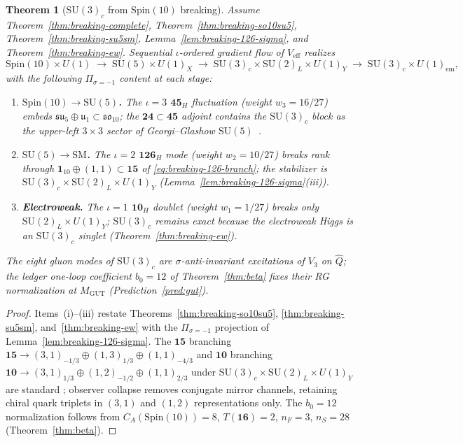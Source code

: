 \documentclass[11pt]{article}
\theoremstyle{plain}
\newtheorem{theorem}{Theorem}[section]
\theoremstyle{definition}
\theoremstyle{remark}
\numberwithin{equation}{section}
\newcommand{\Spin}{\mathrm{Spin}}
\begin{document}
\begin{theorem}[$\mathrm{SU}(3)_c$ from $\Spin(10)$ breaking]
\label{thm:qcd-derived}
Assume Theorem~\ref{thm:breaking-complete},
Theorem~\ref{thm:breaking-so10su5}, Theorem~\ref{thm:breaking-su5sm},
Lemma~\ref{lem:breaking-126-sigma}, and Theorem~\ref{thm:breaking-ew}.
Sequential $\iota$-ordered gradient flow of $V_{\mathrm{eff}}$ realizes
\begin{equation}\label{eq:qcd-breaking-chain}
  \Spin(10)\times U(1)
  \;\longrightarrow\;
  \mathrm{SU}(5)\times U(1)_X
  \;\longrightarrow\;
  \mathrm{SU}(3)_c\times\mathrm{SU}(2)_L\times U(1)_Y
  \;\longrightarrow\;
  \mathrm{SU}(3)_c\times U(1)_{\mathrm{em}},
\end{equation}
with the following $\Pi_{\sigma=-1}$ content at each stage:
\begin{enumerate}[label=(\roman*),leftmargin=*]
  \item \textbf{$\Spin(10)\to\mathrm{SU}(5)$.} The $\iota=3$
    $\mathbf{45}_H$ fluctuation (weight $w_3=16/27$) embeds
    $\mathfrak{su}_5\oplus\mathfrak{u}_1\subset\mathfrak{so}_{10}$; the
    $\mathbf{24}\subset\mathbf{45}$ adjoint contains the $\mathrm{SU}(3)_c$
    block as the upper-left $3\times3$ sector of Georgi--Glashow
    $\mathrm{SU}(5)$~\cite{GeorgiGlashow1974}.
  \item \textbf{$\mathrm{SU}(5)\to\mathrm{SM}$.} The $\iota=2$
    $\mathbf{126}_H$ mode (weight $w_2=10/27$) breaks rank through
    $\mathbf{1}_{10}\oplus(1,1)\subset\mathbf{15}$ of
    \eqref{eq:breaking-126-branch}; the stabilizer is
    $\mathrm{SU}(3)_c\times\mathrm{SU}(2)_L\times U(1)_Y$
    (Lemma~\ref{lem:breaking-126-sigma}(iii)).
  \item \textbf{Electroweak.} The $\iota=1$ $\mathbf{10}_H$ doublet
    (weight $w_1=1/27$) breaks only $\mathrm{SU}(2)_L\times U(1)_Y$;
    $\mathrm{SU}(3)_c$ remains exact because the electroweak Higgs is an
    $\mathrm{SU}(3)_c$ singlet (Theorem~\ref{thm:breaking-ew}).
\end{enumerate}
The eight gluon modes of $\mathrm{SU}(3)_c$ are $\sigma$-anti-invariant
excitations of $V_3$ on $\hat Q$; the ledger one-loop coefficient
$b_0=12$ of Theorem~\ref{thm:beta} fixes their RG normalization at
$M_{\mathrm{GUT}}$ (Prediction~\ref{pred:gut}).
\end{theorem}

\begin{proof}
Items~(i)--(iii) restate Theorems~\ref{thm:breaking-so10su5},
\ref{thm:breaking-su5sm}, and~\ref{thm:breaking-ew} with the
$\Pi_{\sigma=-1}$ projection of Lemma~\ref{lem:breaking-126-sigma}. The
$\mathbf{15}$ branching
$\mathbf{15}\to(3,1)_{-1/3}\oplus(1,3)_{1/3}\oplus(1,1)_{-4/3}$ and
$\mathbf{10}$ branching
$\mathbf{10}\to(3,1)_{1/3}\oplus(1,2)_{-1/2}\oplus(1,1)_{2/3}$ under
$\mathrm{SU}(3)_c\times\mathrm{SU}(2)_L\times U(1)_Y$ are standard
\cite{GeorgiGlashow1974,Witten1985}; observer collapse removes conjugate
mirror channels, retaining chiral quark triplets in $(3,1)$ and $(1,2)$
representations only. The $b_0=12$ normalization follows from
$C_A(\Spin(10))=8$, $T(\mathbf{16})=2$, $n_F=3$, $n_S=28$
(Theorem~\ref{thm:beta}).
\end{proof}
\end{document}
